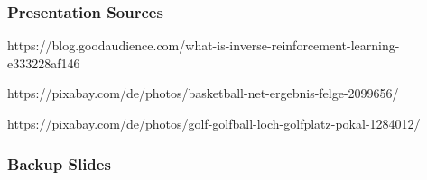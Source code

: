 







\begin{frame}
	\frametitle{Presentation Sources}	
	\vspace{1cm}
	
	https://blog.goodaudience.com/what-is-inverse-reinforcement-learning-e333228af146
	
	https://pixabay.com/de/photos/basketball-net-ergebnis-felge-2099656/
	
	https://pixabay.com/de/photos/golf-golfball-loch-golfplatz-pokal-1284012/
	
\end{frame}
\clearpage








\begin{frame}
	\frametitle{Backup Slides}	
	\vspace{1cm}
	
\end{frame}
\clearpage







